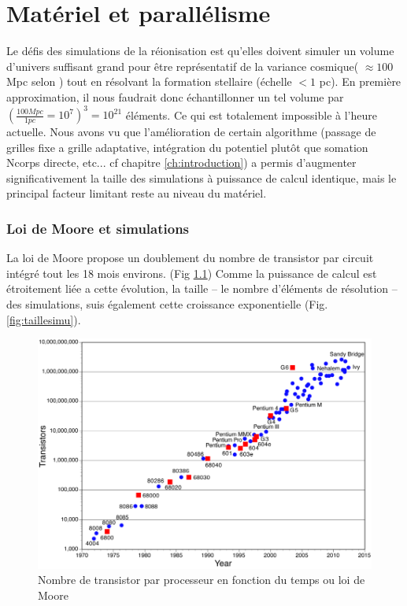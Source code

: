 \chapter{Matériel et parallélisme}
\label{sec:materiel}

Le défis des simulations de la réionisation est qu'elles doivent simuler un volume d'univers suffisant grand pour être représentatif de la variance cosmique( $\approx 100$ Mpc selon \cite{iliev_cosmological_2006}) tout en résolvant la formation stellaire (échelle $<1$ pc).
En première approximation, il nous faudrait donc échantillonner un tel volume par $\left( \frac{100Mpc}{1pc} = 10^7 \right) ^3 = 10^{21}$ éléments.
Ce qui est totalement impossible à l'heure actuelle.
Nous avons vu que l'amélioration de certain algorithme (passage de grilles fixe a grille adaptative, intégration du potentiel plutôt que somation Ncorps directe, etc... cf chapitre \ref{ch:introduction}) a permis d'augmenter significativement la taille des simulations à puissance de calcul identique, mais le principal facteur limitant reste au niveau du matériel.

\subsection{Loi de Moore et simulations}
La loi de Moore \citep{moore1965cramming} propose un doublement du nombre de transistor par circuit intégré tout les 18 mois environs. (Fig \ref{fig:moore})
Comme la puissance de calcul est étroitement liée a cette évolution, la taille -- le nombre d'éléments de résolution -- des simulations, suis également cette croissance exponentielle (Fig. \ref{fig:taillesimu}).

\begin{figure}[bth]
        \includegraphics[width=.95\linewidth]{img/02/moorelaw.png} 
        \caption[Loi de Moore]{Nombre de transistor par processeur en fonction du temps ou loi de Moore}
 		\label{fig:moore}
\end{figure}

